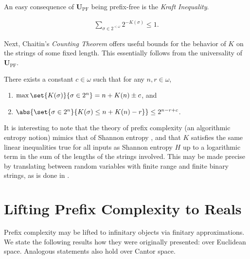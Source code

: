 An easy consequence of $\mathbf{U}_{\operatorname{PF}}$ being prefix-free is the \textit{Kraft Inequality}.
\begin{theorem}
    \label{theorem:kraft_inequality}
    \begin{align*}
        \sum_{\sigma \in 2^{<\omega}} 2^{-K(\sigma)} \leq 1. 
    \end{align*}
\end{theorem}

Next, Chaitin's \textit{Counting Theorem} offers useful bounds for the behavior of $K$ on the strings of some fixed length. This essentially follows from the universality of $\mathbf{U}_{\operatorname{PF}}$. 

\begin{theorem}
    \label{theorem:chaitin_counting_theorem}
    There exists a constant $c \in \omega$ such that for any $n, r \in \omega$, 
    \begin{enumerate}[label=(\roman*)]
        \item $\max \set{K(\sigma)}{\sigma \in 2^n} = n + K(n) \pm c$, and 
        \item $\abs{\set{\sigma \in 2^{n}}{K(\sigma) \leq n  + K(n) - r}} \leq 2^{n - r + c}$.
    \end{enumerate}
\end{theorem}

It is interesting to note that the theory of prefix complexity (an algorithmic entropy notion) mimics that of Shannon entropy \cite{Kol68}, and that $K$ satisfies the same linear inequalities true for all inputs as Shannon entropy $H$ up to a logarithmic term in the sum of the lengths of the strings involved. This may be made precise by translating between random variables with finite range and finite binary strings, as is done in \cite{HRSV00}.

\section{Lifting Prefix Complexity to Reals} \label{section:Lifting_Prefix_Complexity_to_Reals}
Prefix complexity may be lifted to infinitary objects via finitary approximations. We state the following results how they were originally presented: over Euclidean space. Analogous statements also hold over Cantor space. 

